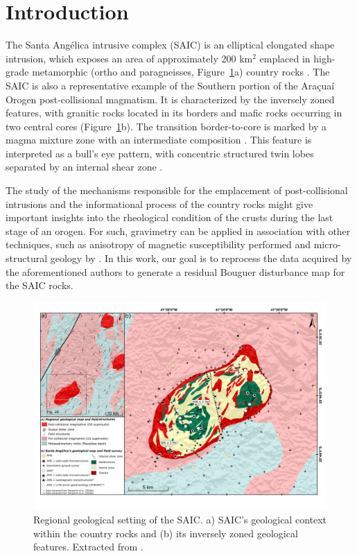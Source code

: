 \section{Introduction}

The Santa Angélica intrusive complex (SAIC) is an elliptical elongated shape intrusion, which exposes an area of
approximately 200 km$^2$ emplaced in high-grade metamorphic (ortho and paragneisses, Figure~\ref{geology}a) country rocks \citep{Decampos2004}. The SAIC is also a representative example of the Southern portion of the Araçuaí Orogen post-collisional magmatism. It is characterized by the inversely zoned features, with granitic rocks located in its borders and mafic rocks occurring in two central cores (Figure~\ref{geology}b). The transition border-to-core is marked by a magma mixture zone with an intermediate composition \citep{Bayer1987, Schmidt1987}. This feature is interpreted as a bull's eye pattern, with concentric structured twin lobes separated by an internal shear zone \citep{Temporim2020}.

The study of the mechanisms responsible for the emplacement of post-collisional intrusions and the informational process of the country rocks might give important insights into the rheological condition of the crusts during the last stage of an orogen. For such, gravimetry can be applied in association with other techniques, such as anisotropy of magnetic susceptibility performed and micro-structural geology by \citet{Souza-Junior2021}. In this work, our goal is to reprocess the data acquired by the aforementioned authors to generate a residual Bouguer disturbance map for the SAIC rocks.


\begin{figure}[H]
  \centering
  \includegraphics[width=1\linewidth]{figures/geology.png}
  \caption{
    Regional geological setting of the SAIC. a) SAIC's geological context within the country rocks and (b) its inversely zoned geological features. Extracted from \citet{Souza-Junior2021}.
      }
  \label{geology}
\end{figure}
